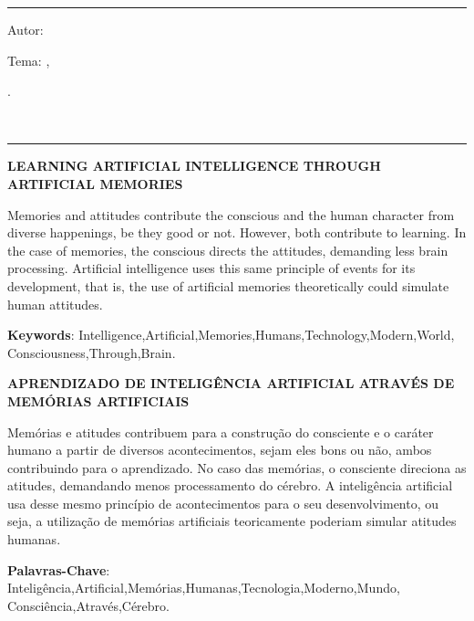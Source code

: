 


\hrule	%
\begin{center} %
\begin{minipage}[c]{12.5cm} %
Autor: \imprimirautor

Tema: \imprimirtitulo 
\imprimirlocal, 
\imprimirorientador\\
\hspace{0.5cm}
\parbox[t]{\textwidth}{\imprimirinstituicao
\imprimirdata.}\\
\hspace{0.5cm}
\end{minipage}
\end{center}
\hrule

\vspace{1cm}

\SingleSpacing
\noindent
{\textbf{LEARNING ARTIFICIAL INTELLIGENCE THROUGH ARTIFICIAL MEMORIES}}
\indent
\small

Memories and attitudes contribute the conscious and the human character from diverse happenings, be they good or not. However, both contribute to learning. In the case of memories, the conscious directs the attitudes, demanding less brain processing. Artificial intelligence uses this same principle of events for its development, that is, the use of artificial memories theoretically could simulate human attitudes.

\noindent
 
\textbf{Keywords}: Intelligence,Artificial,Memories,Humans,Technology,Modern,World,
\\Consciousness,Through,Brain.

\SingleSpacing
\noindent
{\textbf{APRENDIZADO DE INTELIGÊNCIA ARTIFICIAL ATRAVÉS DE MEMÓRIAS ARTIFICIAIS}}
\indent
\small

Memórias e atitudes contribuem para a construção do consciente e o caráter humano a partir de diversos acontecimentos, sejam eles bons ou não, ambos contribuindo para o aprendizado. No caso das memórias, o consciente direciona as atitudes, demandando menos processamento do cérebro. A inteligência artificial usa desse mesmo princípio de acontecimentos para o seu desenvolvimento, ou seja, a utilização de memórias artificiais teoricamente poderiam simular atitudes humanas.

\noindent
 
\textbf{Palavras-Chave}: Inteligência,Artificial,Memórias,Humanas,Tecnologia,Moderno,Mundo,
\\Consciência,Através,Cérebro.

